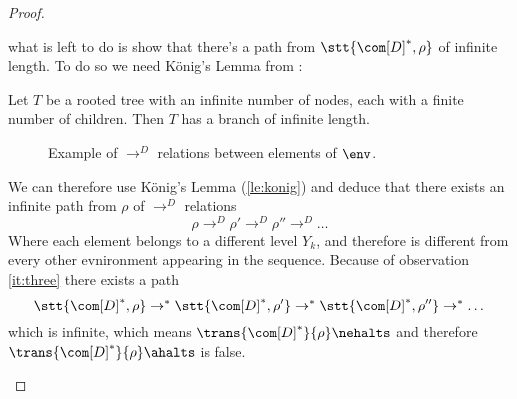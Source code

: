 \begin{proof}
\begin{itemize}
    what is left to do is show that there's a path from
    \(\stt{\com[D]^*, \rho}\) of infinite length.  To do so we need
    König's Lemma from \cite{konig1926lemma}:
    
    \begin{lemma}\label{le:konig}
      Let \(T\) be a rooted tree with an infinite number of nodes,
      each with a finite number of children.  Then \(T\) has a branch
      of infinite length.
    \end{lemma}

    \begin{figure}
      \centering
      \caption{Example of \(\to^D\) relations between elements of
        \(\env\).}\label{fig:tree}
    \end{figure}

    We can therefore use König's Lemma (\ref{le:konig}) and deduce
    that there exists an infinite path from \(\rho\) of \(\to^D\)
    relations
    \begin{equation*}
      \rho \to^D \rho' \to^D \rho'' \to^D \dots
    \end{equation*}
    Where each element belongs to a different level \(Y_k\), and
    therefore is different from every other evnironment appearing in
    the sequence. Because of observation \ref{it:three} there exists a
    path
    \begin{equation*}
      \stt{\com[D]^*, \rho} \to^*\stt{\com[D]^*, \rho'} \to^* \stt{\com[D]^*, \rho''} \to^* \dots
    \end{equation*}
    which is infinite, which means \(\trans{\com[D]^*}{\rho}\nehalts\)
    and therefore \(\trans{\com[D]^*}{\rho} \ahalts\) is false.
    

\end{itemize}
\end{proof}
